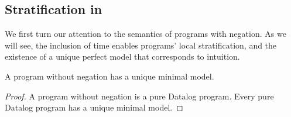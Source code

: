 
\subsection{Stratification in {\large{\bf\slang}}}
\label{sec:strat}
We first turn our attention to the semantics of
programs with negation.  As we will see, the inclusion of time enables
programs' local stratification, and the existence of a unique perfect model
that corresponds to intuition. 






\begin{lemma} \label{lemma:no-neg-unique}
%
A \slang program without negation 
has a unique minimal model.
%
\end{lemma}

\begin{proof} 
%
A \slang program without negation 
is a pure Datalog
program.  Every pure Datalog program has a unique minimal model. 
%
\end{proof}


